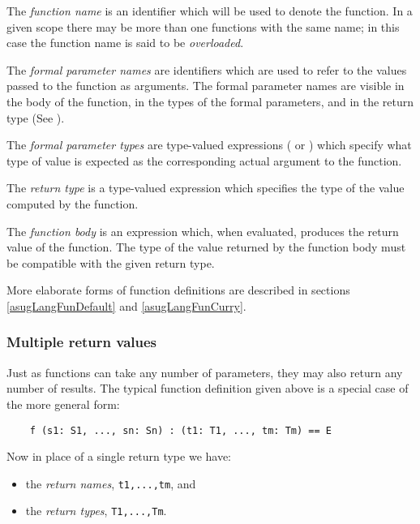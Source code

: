 The {\em function name\/} is an identifier which will be used
to denote the function.
In a given scope there may be more than one functions with the same
name; in this case the function name is said to be {\em overloaded\/}.

The {\em formal parameter names\/} are identifiers which are used to
refer to the values passed to the function as arguments.  The formal
parameter names are visible in the body of the function, in the types
of the formal parameters, and in the return type (See
).

The {\em formal parameter types\/} are type-valued expressions
(\eg{}  or )
which specify what type of value is expected as the corresponding
actual argument to the function.

The {\em return type\/} is a type-valued expression which specifies
the type of the value computed by the function.

The {\em function body\/} is an expression which, when evaluated,
produces the return value of the function.  The type of the
value returned by the function body must be compatible
with the given return type.

More elaborate forms of function definitions are described in sections~%
\ref{asugLangFunDefault} and \ref{asugLangFunCurry}.

\subsubsection{Multiple return values}

Just as functions can take any number of parameters, they may also
return any number of results.  The typical function definition given above
is a special case of the more general form:

\begin{small}
\begin{verbatim}
    f (s1: S1, ..., sn: Sn) : (t1: T1, ..., tm: Tm) == E
\end{verbatim}
\end{small}

Now in place of a single return type we have:

\begin{itemize}
\item the {\em return names\/}, {\tt t1,...,tm}, and 
\item the {\em return types\/}, {\tt T1,...,Tm}.
\end{itemize}

